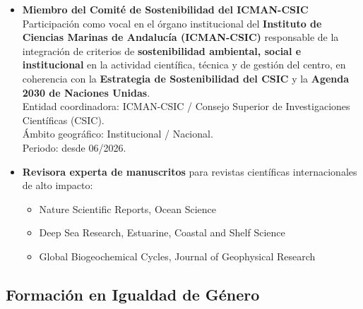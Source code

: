 \documentclass[11pt,a4paper]{article}
\begin{document}
\begin{itemize}[leftmargin=*]
    \item \textbf{Miembro del Comité de Sostenibilidad del ICMAN-CSIC}\\
    Participación como vocal en el órgano institucional del \textbf{Instituto de Ciencias Marinas de Andalucía (ICMAN-CSIC)} responsable de la integración de criterios de \textbf{sostenibilidad ambiental, social e institucional} en la actividad científica, técnica y de gestión del centro, en coherencia con la \textbf{Estrategia de Sostenibilidad del CSIC} y la \textbf{Agenda 2030 de Naciones Unidas}.\\
    Entidad coordinadora: ICMAN-CSIC / Consejo Superior de Investigaciones Científicas (CSIC).\\
    Ámbito geográfico: Institucional / Nacional.\\
    Periodo: desde 06/2026.

    \item \textbf{Revisora experta de manuscritos} para revistas científicas internacionales de alto impacto:
    \begin{itemize}
        \item Nature Scientific Reports, Ocean Science
        \item Deep Sea Research, Estuarine, Coastal and Shelf Science
        \item Global Biogeochemical Cycles, Journal of Geophysical Research
        
    \end{itemize}

\end{itemize}

\subsection{Formación en Igualdad de Género}
\end{document}
